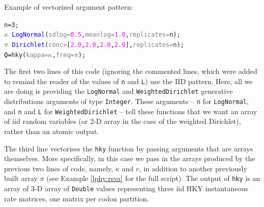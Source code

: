 \documentclass[10pt,letterpaper,table]{article}
\begin{document}
Example of vectorized argument pattern: 
{\singlespacing
\begin{alltt}
  n = 3;
  \textcolor{green}{\(\kappa\)} ~ \textcolor{blue}{LogNormal}(\textcolor{gray}{sdlog=}\textcolor{magenta}{0.5}, \textcolor{gray}{meanlog=}\textcolor{magenta}{1.0}, \textcolor{gray}{replicates=}n);
  \textcolor{green}{\(\pi\)} ~ \textcolor{blue}{Dirichlet}(\textcolor{gray}{conc=}[\textcolor{magenta}{2.0}, \textcolor{magenta}{2.0}, \textcolor{magenta}{2.0}, \textcolor{magenta}{2.0}], \textcolor{gray}{replicates=}n);
  \textcolor{black}{Q = }\textcolor{magenta!80!black}{hky}(\textcolor{gray}{kappa=}\textcolor{green}{\(\kappa\)}, \textcolor{gray}{freq=}\textcolor{green}{\(\pi\)});
\end{alltt} 

The first two lines of this code (ignoring the commented lines, which
were added to remind the reader of the values of \texttt{n} and
\texttt{L}) use the IID pattern.
Here, all we are doing is providing the \texttt{LogNormal} and
\texttt{WeightedDirichlet} generative distributions arguments of
type \texttt{Integer}.
These arguments -- \texttt{n} for \texttt{LogNormal}, and \texttt{n}
and \texttt{L} for \texttt{WeightedDirichlet} -- tell these functions
that we want an array of iid random variables (or 2-D array in the
case of the weighted Dirichlet), rather than an atomic output. 

The third line vectorises the \texttt{hky} function by passing
arguments that are arrays themselves.
More specifically, in this case we pass in the arrays produced by the
previous two lines of code, namely, \texttt{$\kappa$} and
\texttt{$r$}, in addition to another previously built array
\texttt{$\pi$} (see Example \ref{lphy:rsva} for the full script).
The output of \texttt{hky} is an array of 3-D array of \texttt{Double}
values representing three iid HKY \cite{hky} instantaneous rate
matrices, one matrix per codon partition.



}
\end{document}
